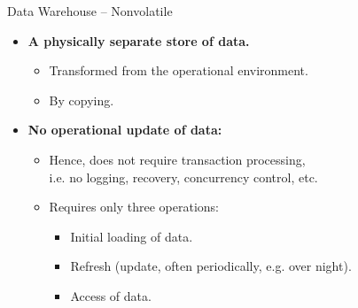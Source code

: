 \begin{frame}{Data Warehouse -- Nonvolatile}
	\begin{itemize}
		\item \textbf{A {\color{airforceblue}physically separate} store of data.}
		      \begin{itemize}
			      \item Transformed from the operational environment.
			      \item By {\color{airforceblue}copying}.
		      \end{itemize}
		\item \textbf{No operational update of data:}
		      \begin{itemize}
			      \item Hence, does not require transaction processing, \\
			            i.e. no logging, recovery, concurrency control, etc.
			      \item Requires only three operations:
			            \begin{itemize}
				            \item Initial loading of data.
				            \item Refresh (update, often periodically, e.g. over night).
				            \item Access of data.
			            \end{itemize}
		      \end{itemize}
	\end{itemize}
\end{frame}

